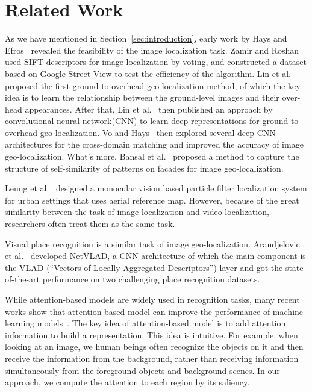 \section{Related Work}
\label{sec:related}
As we have mentioned in Section~\ref{sec:introduction}, early work by Hays and Efros~\cite{hays2008im2gps} revealed the feasibility of the image localization task. %
Zamir and Roshan~\cite{zamir2010accurate} used SIFT descriptors for image localization by voting, and constructed a dataset based on Google Street-View to test the efficiency of the algorithm. 
Lin et al.~\cite{lin2013cross} proposed the first ground-to-overhead geo-localization method, of which the key idea is to learn the relationship between the ground-level images and their over-head appearances. 
After that, Lin et al.~\cite{lin2015learning} then published an approach by convolutional neural network(CNN) to learn deep representations for ground-to-overhead geo-localization. 
Vo and Hays~\cite{vo2016localizing} then explored several deep CNN architectures for the cross-domain matching and improved the accuracy of image geo-localization. 
What's more, Bansal et al.~\cite{bansal2012ultra} proposed a method to capture the structure of self-similarity of patterns on facades for image geo-localization.

Leung et al.~\cite{leung2008localization} designed a monocular vision based particle filter localization system for urban settings that uses aerial reference map. 
However, because of the great similarity between the task of image localization and video localization, researchers often treat them as the same task.

Visual place recognition is a similar task of image geo-localization. 
Arandjelovic et al.~\cite{Arandjelovic16} developed NetVLAD, a CNN architecture of which the main component is the VLAD (``Vectors of Locally Aggregated Descriptors'') layer and got the state-of-the-art performance on two challenging place recognition datasets. 

While attention-based models are widely used in recognition tasks, many recent works show that attention-based model can improve the performance of machine learning models~\cite{mnih2014recurrent,zheng2015neural}. 
The key idea of attention-based model is to add attention information to build a representation. 
This idea is intuitive. 
For example, when looking at an image, we human beings often recognize the objects on it and then receive the information from the background, rather than receiving information simultaneously from the foreground objects and background scenes. 
In our approach, we compute the attention to each region by its saliency. 

